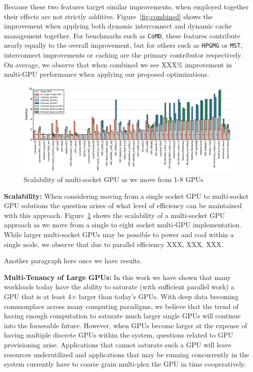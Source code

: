 Because these two features target similar improvements, when employed together 
their effects are not strictly additive.  Figure~\ref{fig:combined} shows the 
improvement when applying both dynamic interconnect and dynamic cache management 
together.  For benchmarks such as \texttt{CoMD}, these features contribute 
nearly equally to the overall improvement, but for others such as 
\texttt{HPGMG} or \texttt{MST}, interconnect improvements or caching are the 
primary contributor respectively.  On average, we observe that when combined we 
see XXX\% improvement in multi-GPU performance when applying our proposed 
optimizations.

\begin{figure}[t]
    \centering
    \includegraphics[width=1.0\textwidth]{figures/plot_scalability_mgpu_WB.pdf}
    \caption{Scalability of multi-socket GPU as we move from 1-8 GPUs}
    \label{fig:scalability}
\end{figure}

\textbf{Scalability:} When considering moving from a single socket GPU to
multi-socket GPU solutions the question arises of what level of efficiency
can be maintained with this approach.  Figure~\ref{fig:scalability} shows the
scalability of a multi-socket GPU approach as we move from a single to 
eight socket multi-GPU implementation.  While larger multi-socket GPUs
may be possible to power and cool within a single node, we observe that due
to parallel efficiency XXX, XXX, XXX.

Another paragraph here once we have results.\vspace{1in}

\textbf{Multi-Tenancy of Large GPUs:} In this work we have shown that many 
workloads today have the ability to
saturate (with sufficient parallel work) a GPU that is at least 4$\times$
larger than today's GPUs.  With deep data becoming commonplace across many
computing paradigms, we believe that the trend of having enough computation
to saturate much larger single GPUs will continue into the forseeable future.
However, when GPUs become larger at the expense of having multiple discrete
GPUs within the system, questions related to GPU provisioning arise.  Applications
that cannot saturate such a GPU will leave resources underutilized and applications
that may be running concurrently in the system currently have to coarse grain
multi-plex the GPU in time cooperatively.  

